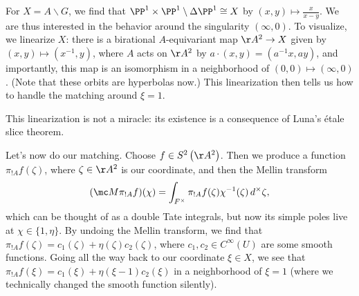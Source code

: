 \documentclass[../notes.tex]{subfiles}
\begin{document}
For $X=A\backslash G$, we find that $\PP^1\times\PP^1\setminus\Delta\PP^1\cong X$ by $(x,y)\mapsto\frac x{x-y}$. We are thus interested in the behavior around the singularity $(\infty,0)$. To visualize, we linearize $X$: there is a birational $A$-equivariant map $\AA^2\to X$ given by $(x,y)\mapsto\left(x^{-1},y\right)$, where $A$ acts on $\AA^2$ by $a\cdot(x,y)=\left(a^{-1}x,ay\right)$, and importantly, this map is an isomorphism in a neighborhood of $(0,0)\mapsto(\infty,0)$. (Note that these orbits are hyperbolas now.) This linearization then tells us how to handle the matching around $\xi=1$.
\begin{remark}
	This linearization is not a miracle: its existence is a consequence of Luna's \'etale slice theorem.
\end{remark}
Let's now do our matching. Choose $f\in S^2\left(\AA^2\right)$. Then we produce a function $\pi_{!A}f(\zeta)$, where $\zeta\in\AA^2$ is our coordinate, and then the Mellin transform
\[(\mc M\pi_{!A}f)(\chi)=\int_{F^\times}\pi_{!A}f(\zeta)\chi^{-1}(\zeta)\,d^\times\zeta,\]
which can be thought of as a double Tate integrals, but now its simple poles live at $\chi\in\{1,\eta\}$. By undoing the Mellin transform, we find that $\pi_{!A}f(\zeta)=c_1(\zeta)+\eta(\zeta) c_2(\zeta)$, where $c_1,c_2\in C^\infty(U)$ are some smooth functions. Going all the way back to our coordinate $\xi\in X$, we see that $\pi_{!A}f(\xi)=c_1(\xi)+\eta(\xi-1)c_2(\xi)$ in a neighborhood of $\xi=1$ (where we technically changed the smooth function silently).
\end{document}
